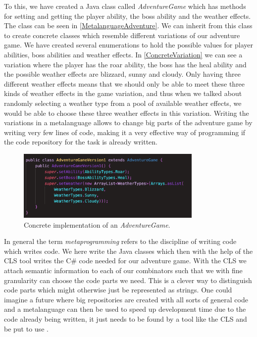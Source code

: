 To this, we have created a Java class called \textit{AdventureGame} which has methods for setting and getting the player ability, the boss ability and the weather effects. The class can be seen in \autoref{MetalanguageAdventure}. We can inherit from this class to create concrete classes which resemble different variations of our adventure game. We have created several enumerations to hold the possible values for player abilities, boss abilities and weather effects. In \autoref{ConcreteVariation} we can see a variation where the player has the roar ability, the boss has the heal ability and the possible weather effects are blizzard, sunny and cloudy. Only having three different weather effects means that we should only be able to meet these three kinds of weather effects in the game variation, and thus when we talked about randomly selecting a weather type from a pool of available weather effects, we would be able to choose these three weather effects in this variation. Writing the variations in a metalanguage allows to change big parts of the adventure game by writing very few lines of code, making it a very effective way of programming if the code repository for the task is already written.
\begin{figure}[H]
	\centering
	\includegraphics[width=0.8\textwidth]{Materials/Adventuregame/Version1}
	\caption{Concrete implementation of an \textit{AdventureGame}.}
	\label{ConcreteVariation}
\end{figure}

In general the term \textit{metaprogramming} refers to the discipline of writing code which writes code. We here write the Java classes which then with the help of the CLS tool writes the C\# code needed for our adventure game. With the CLS we attach semantic information to each of our combinators such that we with fine granularity can choose the code parts we need. This is a clever way to distinguish code parts which might otherwise just be represented as strings. One could imagine a future where big repositories are created with all sorts of general code and a metalanguage can then be used to speed up development time due to the code already being written, it just needs to be found by a tool like the CLS and be put to use . 
